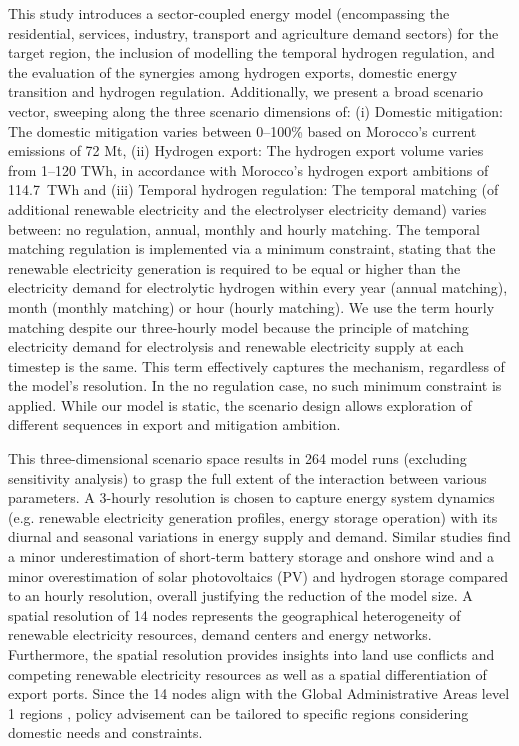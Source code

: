 This study introduces a sector-coupled energy model (encompassing the residential, services, industry, transport and agriculture demand sectors) for the target region, the inclusion of modelling the temporal hydrogen regulation, and the evaluation of the synergies among hydrogen exports, domestic energy transition and hydrogen regulation.
Additionally, we present a broad scenario vector, sweeping along the three scenario dimensions of:
(i) Domestic \co mitigation: The domestic \co mitigation varies between 0--100\% based on Morocco's current emissions of 72 Mt\coe,
(ii) Hydrogen export: The hydrogen export volume varies from 1--120 TWh, in accordance with Morocco's hydrogen export ambitions of 114.7~TWh and
(iii) Temporal hydrogen regulation: The temporal matching (of additional renewable electricity and the electrolyser electricity demand) varies between: no regulation, annual, monthly and hourly matching. The temporal matching regulation is implemented via a minimum constraint, stating that the renewable electricity generation is required to be equal or higher than the electricity demand for electrolytic hydrogen within every year (annual matching), month (monthly matching) or hour (hourly matching). 
We use the term hourly matching despite our three-hourly model because the principle of matching electricity demand for electrolysis and renewable electricity supply at each timestep is the same. This term effectively captures the mechanism, regardless of the model’s resolution. In the no regulation case, no such minimum constraint is applied.
While our model is static, the scenario design allows exploration of different sequences in export and mitigation ambition.

This three-dimensional scenario space results in 264 model runs (excluding sensitivity analysis) to grasp the full extent of the interaction between various parameters.
A 3-hourly resolution is chosen to capture energy system dynamics (e.g. renewable electricity generation profiles, energy storage operation) with its diurnal and seasonal variations in energy supply and demand. Similar studies \cite{Neumann2023, Schlachtberger2018} find a minor underestimation of short-term battery storage and onshore wind and a minor overestimation of solar photovoltaics (PV) and hydrogen storage compared to an hourly resolution, overall justifying the reduction of the model size. 
A spatial resolution of 14 nodes represents the geographical heterogeneity of renewable electricity resources, demand centers and energy networks. Furthermore, the spatial resolution provides insights into land use conflicts and competing renewable electricity resources as well as a spatial differentiation of export ports. Since the 14 nodes align with the Global Administrative Areas level 1 regions \cite{gadm2022}, policy advisement can be tailored to specific regions considering domestic needs and constraints.

